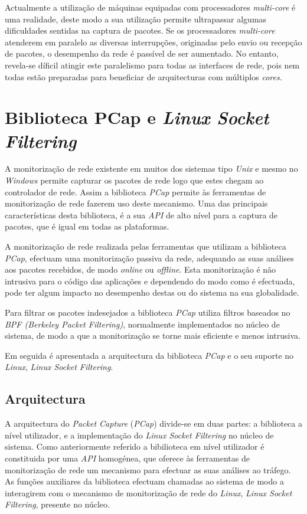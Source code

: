 Actualmente a utilização de máquinas equipadas com processadores \textit{multi-core} é uma realidade, deste modo a sua utilização permite ultrapassar algumas dificuldades sentidas na captura de pacotes.
Se os processadores \textit{multi-core} atenderem em paralelo as diversas interrupções, originadas pelo envio ou recepção de pacotes, o desempenho da rede é passível de ser aumentado.
No entanto, revela-se díficil atingir este paralelismo para todas as interfaces de rede, pois nem todas estão preparadas para beneficiar de arquitecturas com múltiplos \textit{cores}.

\section{Biblioteca PCap e \textit{Linux Socket Filtering}}\label{sect:LibPcap}

A monitorização de rede existente em muitos dos sistemas tipo \textit{Unix} e mesmo no \textit{Windows} permite capturar os pacotes de rede logo que estes chegam ao controlador de rede.
Assim a biblioteca \textit{PCap}\cite{LibPcap} permite às ferramentas de monitorização de rede fazerem uso deste mecanismo.
Uma das principais características desta biblioteca, é a sua \textit{API} de alto nível para a captura de pacotes, que é igual em todas as plataformas.

A monitorização de rede realizada pelas ferramentas que utilizam a biblioteca \textit{PCap}, efectuam uma monitorização passiva da rede, adequando as suas análises aos pacotes recebidos, de modo \textit{online} ou \textit{offline}.
Esta monitorização é não intrusiva para o código das aplicações e dependendo do modo como é efectuada, pode ter algum impacto no desempenho destas ou do sistema na sua globalidade.

Para filtrar os pacotes indesejados a biblioteca \textit{PCap} utiliza filtros baseados no \textit{BPF (Berkeley Packet Filtering)}, normalmente implementados no núcleo de sistema, de modo a que a monitorização se torne mais eficiente e menos intrusiva.

Em seguida é apresentada a arquitectura da biblioteca \textit{PCap} e o seu suporte no \textit{Linux}, \textit{Linux Socket Filtering}.

\subsection {Arquitectura}
\label{sect:architecture_libpcap}
A arquitectura do \textit{Packet Capture} (\textit{PCap}) divide-se em duas partes: a biblioteca a nível utilizador, e a implementação do \textit{Linux Socket Filtering} no núcleo de sistema.
Como anteriormente referido a bibilioteca em nível utilizador é constituida por uma \textit{API} homogénea, que oferece às ferramentas de monitorização de rede um mecanismo para efectuar as suas análises ao tráfego.
As funções auxiliares da biblioteca efectuam chamadas ao sistema de modo a interagirem com o mecanismo de monitorização de rede do \textit{Linux}, \textit{Linux Socket Filtering}, presente no núcleo.

